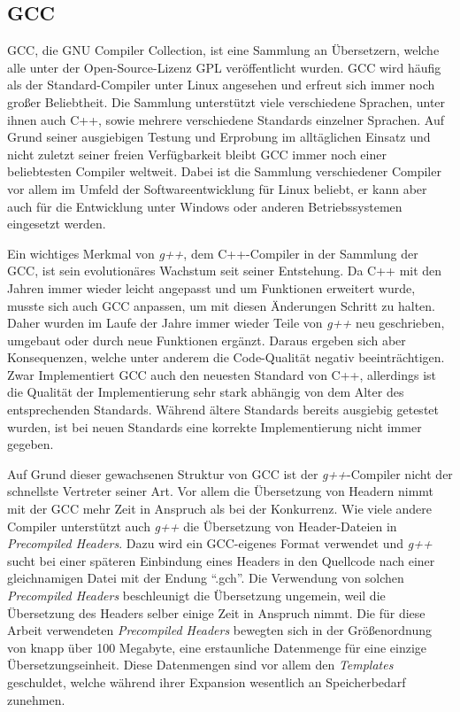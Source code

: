 \subsection{GCC}
GCC, die GNU Compiler Collection, ist eine Sammlung an Übersetzern, welche alle unter der Open-Source-Lizenz GPL veröffentlicht wurden. GCC wird häufig als der Standard-Compiler unter Linux angesehen
und erfreut sich immer noch großer Beliebtheit. Die Sammlung unterstützt viele verschiedene Sprachen, unter ihnen auch C++, sowie mehrere verschiedene Standards einzelner Sprachen. Auf Grund seiner
ausgiebigen Testung und Erprobung im all\-täg\-lich\-en Einsatz und nicht zuletzt seiner freien Verfügbarkeit bleibt GCC immer noch einer beliebtesten Compiler weltweit. Dabei ist die Sammlung verschiedener
Compiler vor allem im Umfeld der Softwareentwicklung für Linux beliebt, er kann aber auch für die Entwicklung unter Windows oder anderen Betriebssystemen eingesetzt werden.

Ein wichtiges Merkmal von \textit{g++}, dem C++-Compiler in der Sammlung der GCC, ist sein evolutionäres Wachstum seit seiner Entstehung. Da C++ mit den Jahren immer wieder lei\-cht angepasst und um Funktionen
erweitert wurde, musste sich auch GCC anpassen, um mit diesen Änderungen Schritt zu halten. Daher wurden im Laufe der Jahre immer wieder Teile von \textit{g++} neu geschrieben, umgebaut oder durch
neue Funktionen ergänzt. Daraus ergeben sich aber Konsequenzen, welche unter anderem die Code-Qualität negativ beeinträchtigen. Zwar Implementiert GCC auch den neuesten Standard von C++, allerdings
ist die Qualität der Implementierung sehr stark abhängig von dem Alter des entsprechenden Standards. Während ältere Standards bereits ausgiebig getestet wurden, ist bei neuen Standards eine korrekte 
Implementierung nicht immer gegeben. 

Auf Grund dieser gewachsenen Struktur von GCC ist der \textit{g++}-Compiler nicht der schnellste Vertreter seiner Art. Vor allem die Übersetzung von Headern nimmt mit der GCC mehr Zeit in Anspruch als
bei der Konkurrenz. Wie viele andere Compiler unterstützt auch \textit{g++} die Übersetzung von Header-Dateien in \textit{Precompiled Headers}. Dazu wird ein GCC-eigenes Format verwendet und \textit{g++} sucht bei einer
späteren Einbindung eines Headers in den Quellcode nach einer gleichnamigen Datei mit der Endung \enquote{.gch}. Die Verwendung von solchen \textit{Precompiled Headers} beschleunigt die Übersetzung ungemein, 
weil die Übersetzung des Headers selber einige Zeit in Anspruch nimmt. Die für diese Arbeit verwendeten \textit{Precompiled Headers} bewegten sich in der Größenordnung von knapp über 100 Megabyte, 
eine erstaunliche Datenmenge für eine einzige Übersetzungseinheit. Diese Datenmengen sind vor allem den \textit{Templates} geschuldet, welche während ihrer Expansion wesentlich an Speicherbedarf zunehmen.

